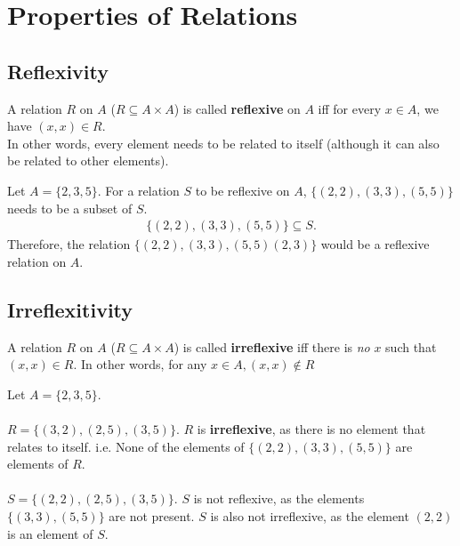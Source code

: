 \documentclass[../notes.tex]{subfiles}
\begin{document}
		\section{Properties of Relations}
			\subsection{Reflexivity}
				A relation $R$ on $A$ ($R \subseteq A \times A$) is called \textbf{reflexive} on $A$ iff for every $x \in A$, we have $(x, x) \in R$.\\
				In other words, every element needs to be related to itself (although it can also be related to other elements).
				\begin{examplebox}
					Let $A = \{2, 3, 5\}$. For a relation $S$ to be reflexive on $A$, $\bigl\{(2, 2), (3, 3), (5, 5)\bigr\}$ needs to be a subset of $S$.
						\begin{align*}
							\bigl\{(2, 2), (3, 3), (5, 5)\bigr\} \subseteq S.
						\end{align*}
					Therefore, the relation $\bigl\{(2, 2), (3, 3), (5, 5) (2, 3)\bigr\}$ would be a reflexive relation on $A$.
				\end{examplebox}
			\subsection{Irreflexitivity}
				A relation $R$ on $A$ ($R \subseteq A \times A$) is called \textbf{irreflexive} iff there is \textit{no} $x$ such that $(x, x) \in R$. In other words, for any $x \in A, (x, x) \notin R$
				\begin{examplebox}
					Let $A = \{2, 3, 5\}$.\\
					\vspace{2mm}\\
					$R = \bigl\{(3, 2), (2, 5), (3, 5)\bigr\}$. $R$ is \textbf{irreflexive}, as there is no element that relates to itself. i.e. None of the elements of $\bigl\{(2, 2), (3, 3), (5, 5)\bigr\}$ are elements of $R$.\\
					\vspace{2mm}\\
					$S = \bigl\{(2, 2), (2, 5), (3, 5)\bigr\}$. $S$ is not reflexive, as the elements $\bigl\{(3, 3), (5, 5)\bigr\}$ are not present. $S$ is also not irreflexive, as the element $(2, 2)$ is an element of $S$.
				\end{examplebox}
\end{document}
